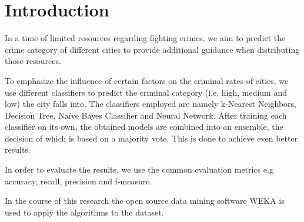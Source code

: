 \section{Introduction}

In a time of limited resources regarding fighting crimes, we aim to predict the crime category of different
cities to provide additional guidance when distributing those resources.

To emphasize the influence of certain factors on the criminal rates of cities, we use different
classifiers to predict the criminal category (i.e. high, medium and low) the city falls into. The classifiers
employed are namely k-Nearest Neighbors, Decision Tree, Na\"ive Bayes Classifier and Neural Network.
After training each classifier on its own, the obtained models are combined into an ensemble, the decision of
which is based on a majority vote. This is done to achieve even better results.

In order to evaluate the results, we use the common evaluation metrics e.g accuracy, recall, precision and
f-measure.

In the course of this research the open source data mining software WEKA is used to apply the algorithms to
the dataset.
\vspace*{\fill}
